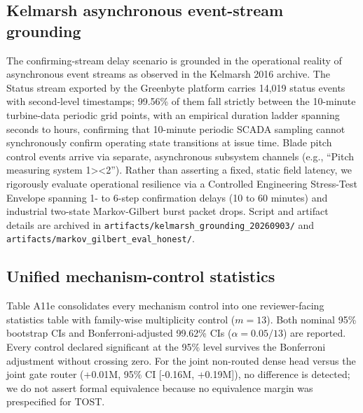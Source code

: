 \documentclass[
  journal]{IEEEtran}
\begin{document}
\FloatBarrier

\subsection*{Kelmarsh asynchronous event-stream
grounding}\label{kelmarsh-asynchronous-event-stream-grounding}

The confirming-stream delay scenario is grounded in the operational
reality of asynchronous event streams as observed in the Kelmarsh 2016
archive. The Status stream exported by the Greenbyte platform carries
14,019 status events with second-level timestamps; 99.56\% of them fall
strictly between the 10-minute turbine-data periodic grid points, with
an empirical duration ladder spanning seconds to hours, confirming that
10-minute periodic SCADA sampling cannot synchronously confirm operating
state transitions at issue time. Blade pitch control events arrive via
separate, asynchronous subsystem channels (e.g., ``Pitch measuring
system 1\textgreater\textless2''). Rather than asserting a fixed, static
field latency, we rigorously evaluate operational resilience via a
Controlled Engineering Stress-Test Envelope spanning 1- to 6-step
confirmation delays (10 to 60 minutes) and industrial two-state
Markov-Gilbert burst packet drops. Script and artifact details are
archived in \texttt{artifacts/kelmarsh\_grounding\_20260903/} and
\texttt{artifacts/markov\_gilbert\_eval\_honest/}.

\FloatBarrier

\subsection*{Unified mechanism-control
statistics}\label{unified-mechanism-control-statistics}

Table A11e consolidates every mechanism control into one reviewer-facing
statistics table with family-wise multiplicity control (\(m=13\)). Both
nominal 95\% bootstrap CIs and Bonferroni-adjusted 99.62\% CIs
(\(\alpha = 0.05/13\)) are reported. Every control declared significant
at the 95\% level survives the Bonferroni adjustment without crossing
zero. For the joint non-routed dense head versus the joint gate router
(+0.01M, 95\% CI {[}-0.16M, +0.19M{]}), no difference is detected; we do
not assert formal equivalence because no equivalence margin was
prespecified for TOST.
\end{document}
